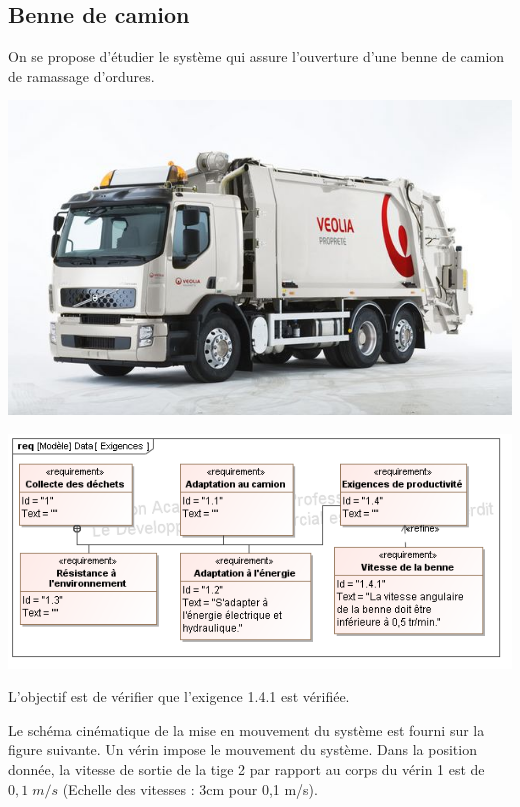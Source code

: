 \documentclass[10pt,fleqn]{article} %
\begin{document}
\begin{multicols}{2}
\section{Benne de camion}

\setcounter{subparagraph}{0}
On se propose d'étudier le système qui assure l'ouverture d'une benne de camion de ramassage d'ordures.

\begin{minipage}[c]{.3\linewidth}
\begin{center}
\includegraphics[width=.95\textwidth]{images/fig3_1}\hfill
\end{center}
\end{minipage} \hfill
\begin{minipage}[c]{.65\linewidth}
\begin{center}
\includegraphics[width=.95\textwidth]{images/SysML/Exigences_Benne}
\end{center}
\end{minipage}

\begin{obj}
L'objectif est de vérifier que l'exigence 1.4.1 est vérifiée.
\end{obj}


Le schéma cinématique de la mise en mouvement du système est fourni sur la figure suivante. Un vérin impose le mouvement du système. Dans la position donnée, la vitesse de sortie de la tige 2 par rapport au corps du vérin 1 est de $0,1\; m/s$ (Echelle des vitesses : 3cm pour 0,1 m/s).



\end{multicols}
\end{document}
